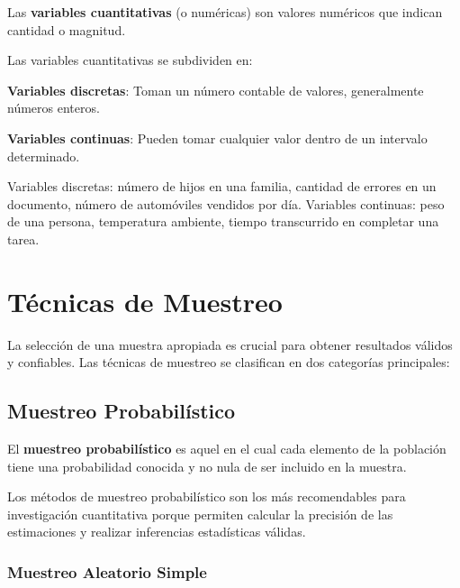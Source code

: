 \begin{definition}
Las \textbf{variables cuantitativas} (o numéricas) son valores numéricos que indican cantidad o magnitud.
\end{definition}

Las variables cuantitativas se subdividen en:

\begin{definition}
\textbf{Variables discretas}: Toman un número contable de valores, generalmente números enteros.
\end{definition}

\begin{definition}
\textbf{Variables continuas}: Pueden tomar cualquier valor dentro de un intervalo determinado.
\end{definition}

\begin{example}
Variables discretas: número de hijos en una familia, cantidad de errores en un documento, número de automóviles vendidos por día.
Variables continuas: peso de una persona, temperatura ambiente, tiempo transcurrido en completar una tarea.
\end{example}

\section{Técnicas de Muestreo}

La selección de una muestra apropiada es crucial para obtener resultados válidos y confiables. Las técnicas de muestreo se clasifican en dos categorías principales:

\subsection{Muestreo Probabilístico}

\begin{definition}
El \textbf{muestreo probabilístico} es aquel en el cual cada elemento de la población tiene una probabilidad conocida y no nula de ser incluido en la muestra.
\end{definition}

\begin{remark}
Los métodos de muestreo probabilístico son los más recomendables para investigación cuantitativa porque permiten calcular la precisión de las estimaciones y realizar inferencias estadísticas válidas.
\end{remark}

\subsubsection{Muestreo Aleatorio Simple}

